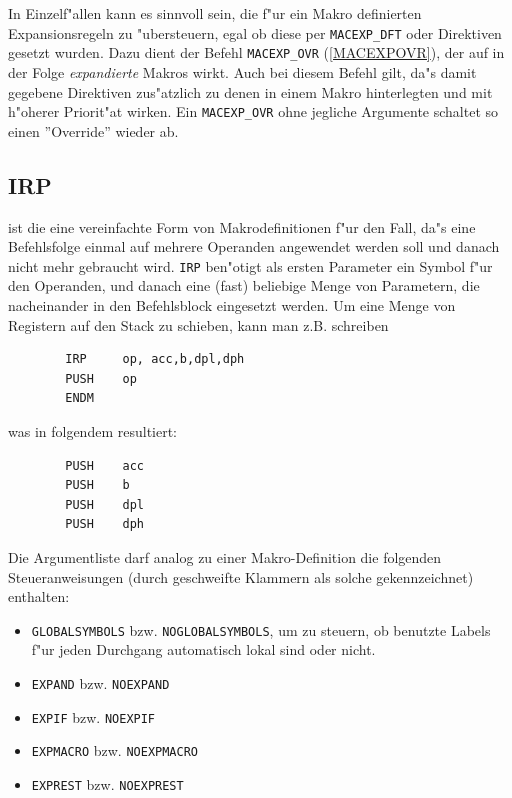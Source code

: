 \documentclass[12pt,a4paper,twoside]{report}
\makeatletter
\newcommand{\tty}[1]{{\tt #1}}
\newcommand{\ttindex}[1]{\index{#1@{\tt #1}}}
\makeatother
\begin{document}
In Einzelf"allen kann es sinnvoll sein, die f"ur ein Makro definierten
Expansionsregeln zu "ubersteuern, egal ob diese per \tty{MACEXP\_DFT} oder
Direktiven gesetzt wurden.  Dazu dient der Befehl \tty{MACEXP\_OVR}
(\ref{MACEXPOVR}), der auf in der Folge {\it expandierte} Makros wirkt.  Auch
bei diesem Befehl gilt, da"s damit gegebene Direktiven zus"atzlich zu
denen in einem Makro hinterlegten und mit h"oherer Priorit"at wirken.  Ein
\tty{MACEXP\_OVR} ohne jegliche Argumente schaltet so einen ''Override''
wieder ab.


\subsection{IRP}
\ttindex{IRP}

ist die eine vereinfachte Form von Makrodefinitionen f"ur den Fall,
da"s eine Befehlsfolge einmal auf mehrere Operanden angewendet werden
soll und danach nicht mehr gebraucht wird.  \tty{IRP} ben"otigt als ersten
Parameter ein Symbol f"ur den Operanden, und danach eine (fast)
beliebige Menge von Parametern, die nacheinander in den Befehlsblock
eingesetzt werden.  Um eine Menge von Registern auf den Stack zu
schieben, kann man z.B. schreiben
\begin{verbatim}
        IRP     op, acc,b,dpl,dph
        PUSH    op
        ENDM
\end{verbatim}
was in folgendem resultiert:
\begin{verbatim}
        PUSH    acc
        PUSH    b
        PUSH    dpl
        PUSH    dph
\end{verbatim}
Die Argumentliste darf analog zu einer Makro-Definition die folgenden
Steueranweisungen (durch geschweifte Klammern als solche gekennzeichnet)
enthalten:
\begin{itemize}
\item{\tty{GLOBALSYMBOLS} bzw. \tty{NOGLOBALSYMBOLS}, um zu steuern,
      ob benutzte Labels f"ur jeden Durchgang automatisch lokal
      sind oder nicht.}
\item{\tty{EXPAND} bzw. \tty{NOEXPAND}}
\item{\tty{EXPIF} bzw. \tty{NOEXPIF}}
\item{\tty{EXPMACRO} bzw. \tty{NOEXPMACRO}}
\item{\tty{EXPREST} bzw. \tty{NOEXPREST}}
\end{itemize}

\end{document}
